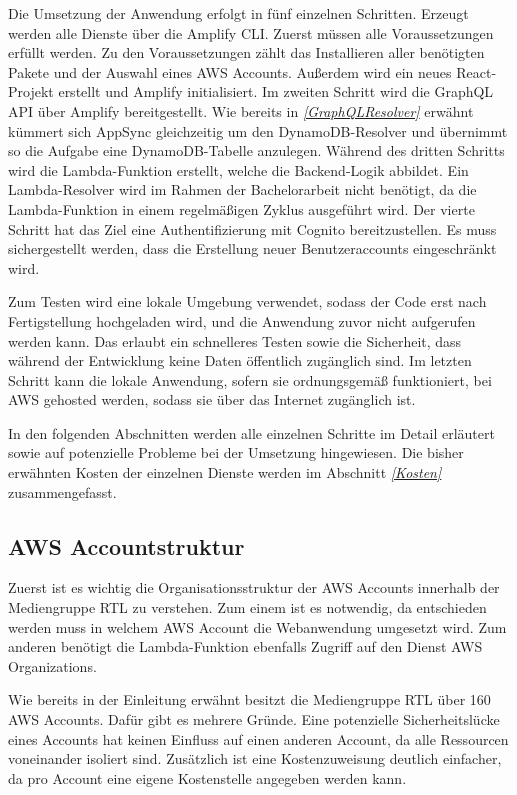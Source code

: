 Die Umsetzung der Anwendung erfolgt in fünf einzelnen Schritten.
Erzeugt werden alle Dienste über die Amplify CLI.
Zuerst müssen alle Voraussetzungen erfüllt werden.
Zu den Voraussetzungen zählt das Installieren aller benötigten Pakete und der Auswahl eines AWS Accounts.
Außerdem wird ein neues React-Projekt erstellt und Amplify initialisiert.
Im zweiten Schritt wird die GraphQL API über Amplify bereitgestellt.
Wie bereits in \textit{\ref{GraphQLResolver} } erwähnt kümmert sich AppSync gleichzeitig um den DynamoDB-Resolver und übernimmt so die Aufgabe eine DynamoDB-Tabelle anzulegen.
Während des dritten Schritts wird die Lambda-Funktion erstellt, welche die Backend-Logik abbildet.
Ein Lambda-Resolver wird im Rahmen der Bachelorarbeit nicht benötigt, da die Lambda-Funktion in einem regelmäßigen Zyklus ausgeführt wird.
Der vierte Schritt hat das Ziel eine Authentifizierung mit Cognito bereitzustellen.
Es muss sichergestellt werden, dass die Erstellung neuer Benutzeraccounts eingeschränkt wird.

Zum Testen wird eine lokale Umgebung verwendet, sodass der Code erst nach Fertigstellung hochgeladen wird, und die Anwendung zuvor nicht aufgerufen werden kann.
Das erlaubt ein schnelleres Testen sowie die Sicherheit, dass während der Entwicklung keine Daten öffentlich zugänglich sind.
Im letzten Schritt kann die lokale Anwendung, sofern sie ordnungsgemäß funktioniert, bei AWS gehosted werden, sodass sie über das Internet zugänglich ist.


In den folgenden Abschnitten werden alle einzelnen Schritte im Detail erläutert sowie auf potenzielle Probleme bei der Umsetzung hingewiesen.
Die bisher erwähnten Kosten der einzelnen Dienste werden im Abschnitt \textit{\ref{Kosten} } zusammengefasst.

\subsection{AWS Accountstruktur }
\label{Accountstruktur}

Zuerst ist es wichtig die Organisationsstruktur der AWS Accounts innerhalb der Mediengruppe RTL zu verstehen.
Zum einem ist es notwendig, da entschieden werden muss in welchem AWS Account die Webanwendung umgesetzt wird.
Zum anderen benötigt die Lambda-Funktion ebenfalls Zugriff auf den Dienst AWS Organizations.

Wie bereits in der Einleitung erwähnt besitzt die Mediengruppe RTL über 160 AWS Accounts.
Dafür gibt es mehrere Gründe.
Eine potenzielle Sicherheitslücke eines Accounts hat keinen Einfluss auf einen anderen Account, da alle Ressourcen voneinander isoliert sind.
Zusätzlich ist eine Kostenzuweisung deutlich einfacher, da pro Account eine eigene Kostenstelle angegeben werden kann.

